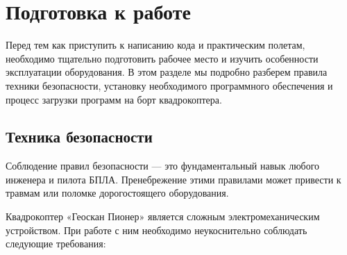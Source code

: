 \section{Подготовка к работе}

Перед тем как приступить к написанию кода и практическим полетам, необходимо тщательно подготовить рабочее место и изучить особенности эксплуатации оборудования. В этом разделе мы подробно разберем правила техники безопасности, установку необходимого программного обеспечения и процесс загрузки программ на борт квадрокоптера.

\subsection{Техника безопасности}

\begin{warnbox}
    Соблюдение правил безопасности — это фундаментальный навык любого инженера и пилота БПЛА. Пренебрежение этими правилами может привести к травмам или поломке дорогостоящего оборудования.
\end{warnbox}

Квадрокоптер «Геоскан Пионер» является сложным электромеханическим устройством. При работе с ним необходимо неукоснительно соблюдать следующие требования:

